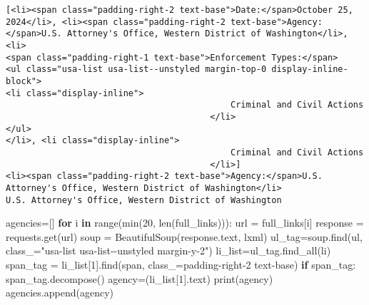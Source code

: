 \documentclass[
  letterpaper,
  DIV=11,
  numbers=noendperiod]{scrartcl}
\newenvironment{Shaded}{\begin{snugshade}}{\end{snugshade}}
\newcommand{\BuiltInTok}[1]{\textcolor[rgb]{0.00,0.23,0.31}{#1}}
\newcommand{\ControlFlowTok}[1]{\textcolor[rgb]{0.00,0.23,0.31}{\textbf{#1}}}
\newcommand{\DecValTok}[1]{\textcolor[rgb]{0.68,0.00,0.00}{#1}}
\newcommand{\KeywordTok}[1]{\textcolor[rgb]{0.00,0.23,0.31}{\textbf{#1}}}
\newcommand{\NormalTok}[1]{\textcolor[rgb]{0.00,0.23,0.31}{#1}}
\newcommand{\OperatorTok}[1]{\textcolor[rgb]{0.37,0.37,0.37}{#1}}
\newcommand{\StringTok}[1]{\textcolor[rgb]{0.13,0.47,0.30}{#1}}
\begin{document}
\begin{verbatim}
[<li><span class="padding-right-2 text-base">Date:</span>October 25, 2024</li>, <li><span class="padding-right-2 text-base">Agency:</span>U.S. Attorney's Office, Western District of Washington</li>, <li>
<span class="padding-right-1 text-base">Enforcement Types:</span>
<ul class="usa-list usa-list--unstyled margin-top-0 display-inline-block">
<li class="display-inline">
                                            Criminal and Civil Actions
                                        </li>
</ul>
</li>, <li class="display-inline">
                                            Criminal and Civil Actions
                                        </li>]
<li><span class="padding-right-2 text-base">Agency:</span>U.S. Attorney's Office, Western District of Washington</li>
U.S. Attorney's Office, Western District of Washington
\end{verbatim}

\begin{Shaded}
\begin{Highlighting}[]
\NormalTok{agencies}\OperatorTok{=}\NormalTok{[]}
\ControlFlowTok{for}\NormalTok{ i }\KeywordTok{in} \BuiltInTok{range}\NormalTok{(}\BuiltInTok{min}\NormalTok{(}\DecValTok{20}\NormalTok{, }\BuiltInTok{len}\NormalTok{(full\_links))):}
\NormalTok{  url }\OperatorTok{=}\NormalTok{ full\_links[i]}
\NormalTok{  response }\OperatorTok{=}\NormalTok{ requests.get(url)}
\NormalTok{  soup }\OperatorTok{=}\NormalTok{ BeautifulSoup(response.text, }\StringTok{\textquotesingle{}lxml\textquotesingle{}}\NormalTok{)}
\NormalTok{  ul\_tag}\OperatorTok{=}\NormalTok{soup.find(}\StringTok{\textquotesingle{}ul\textquotesingle{}}\NormalTok{, class\_}\OperatorTok{=}\StringTok{"usa{-}list usa{-}list{-}{-}unstyled margin{-}y{-}2"}\NormalTok{)}
\NormalTok{  li\_list}\OperatorTok{=}\NormalTok{ul\_tag.find\_all(}\StringTok{\textquotesingle{}li\textquotesingle{}}\NormalTok{)}
\NormalTok{  span\_tag }\OperatorTok{=}\NormalTok{ li\_list[}\DecValTok{1}\NormalTok{].find(}\StringTok{\textquotesingle{}span\textquotesingle{}}\NormalTok{, class\_}\OperatorTok{=}\StringTok{\textquotesingle{}padding{-}right{-}2 text{-}base\textquotesingle{}}\NormalTok{)}
  \ControlFlowTok{if}\NormalTok{ span\_tag:}
\NormalTok{    span\_tag.decompose()}
\NormalTok{  agency}\OperatorTok{=}\NormalTok{(li\_list[}\DecValTok{1}\NormalTok{].text)}
  \BuiltInTok{print}\NormalTok{(agency)}
\NormalTok{  agencies.append(agency)}
\end{Highlighting}
\end{Shaded}
\end{document}

